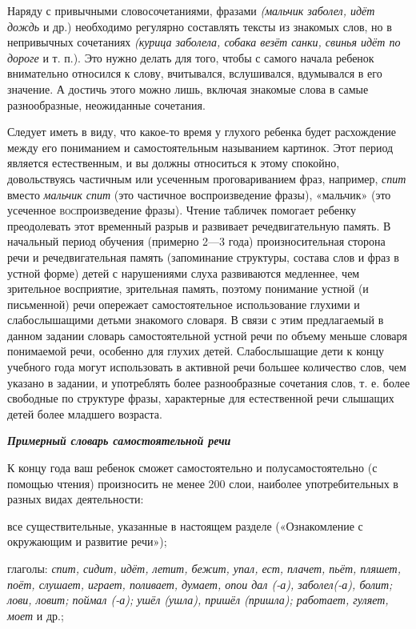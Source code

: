 \documentclass[a5paper]{book}
\renewcommand{\emph}[1]{\textit{#1}}
\begin{document}
Наряду с привычными словосочетаниями, фразами \emph{(мальчик заболел,
идёт дождь} и др.) необходимо регулярно составлять тексты из знакомых
слов, но в непривычных сочетаниях \emph{(курица заболела, собака везёт
санки, свинья идёт по дороге} и т. п.). Это нужно делать для того, чтобы
с самого начала ребенок внимательно относился к слову, вчитывался,
вслушивался, вдумывался в его значение. А достичь этого можно лишь,
включая знакомые слова в самые разнообразные, неожиданные сочетания.

Следует иметь в виду, что какое-то время у глухого ребенка будет
расхождение между его пониманием и самостоятельным называнием картинок.
Этот период является естественным, и вы должны относиться к этому
спокойно, довольствуясь частичным или усеченным проговариванием фраз,
например, \emph{спит} вместо \emph{мальчик спит} (это частичное
воспроизведение фразы), «мальчик» (это усеченное
\textsc{вос}произведение фразы). Чтение табличек помогает ребенку
преодолевать этот временный разрыв и развивает речедвигательную память.
В начальный период обучения (примерно 2---3 года) произносительная
сторона речи и речедвигательная память (запоминание структуры, состава
слов и фраз в устной форме) детей с нарушениями слуха развиваются
медленнее, чем зрительное восприятие, зрительная память, поэтому
понимание устной (и письменной) речи опережает самостоятельное
использование глухими и слабослышащими детьми знакомого словаря. В связи
с этим предлагаемый в данном задании словарь самостоятельной устной речи
по объему меньше словаря понимаемой речи, особенно для глухих детей.
Слабослышащие дети к концу учебного года могут использовать в активной
речи большее количество слов, чем указано в задании, и употреблять более
разнообразные сочетания слов, т. е. более свободные по структуре фразы,
характерные для естественной речи слышащих детей более младшего
возраста.

\emph{\textbf{Примерный словарь самостоятельной речи}}

К концу года ваш ребенок сможет самостоятельно и полусамостоятельно (с
помощью чтения) произносить не менее 200 слои, наиболее употребительных
в разных видах деятельности:

все существительные, указанные в настоящем разделе («Ознакомление с
окружающим и развитие речи»);

глаголы: \emph{спит, сидит, идёт, летит, бежит, упал, ест, плачет, пьёт,
пляшет, поёт, слушает, играет, поливает, думает, опои дал (-а),
заболел(-а), болит; лови, ловит; поймал (-а); ушёл (ушла), пришёл
(пришла); работает, гуляет, моет} и др.;
\end{document}
